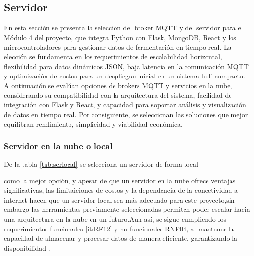 \subsection{Servidor}


En esta sección se presenta la selección del broker MQTT y del servidor para el Módulo 4
del proyecto, que integra Python con Flask, MongoDB, React y los microcontroladores para gestionar
datos de fermentación en tiempo real. La elección se fundamenta en los requerimientos de escalabilidad
horizontal, flexibilidad para datos dinámicos JSON, baja latencia en la comunicación MQTT y 
optimización de costos para un despliegue inicial en un sistema IoT compacto. 
A ontinuación se evalúan opciones 
de brokers MQTT y servicios en la nube, considerando su compatibilidad con la arquitectura del 
sistema, facilidad de integración con Flask y React, y capacidad para soportar análisis y
visualización de datos en tiempo real. Por consiguiente, se seleccionan las soluciones que
mejor equilibran rendimiento, simplicidad y viabilidad económica.

\subsubsection{Servidor en la nube o local}
De la tabla  \cref{tab:serlocal} se selecciona un servidor de forma local

como la mejor opción, y apesar de que un servidor en la nube ofrece ventajas significativas,
las limitaiciones de costos y la dependencia de la conectividad a internet hacen que un servidor local 
sea más adecuado para este proyecto,sin embargo las herramientas previamente seleccionadas permiten 
poder escalar hacia una arquitectura en la nube en un futuro.Aun así, se sigue cumpliendo los
requerimientos funcionales \ref{it:RF12} y no funcionales RNF04, al mantener 
la capacidad de almacenar y procesar datos de manera eficiente, garantizando la disponibilidad .

\begingroup
\setlength{\tabcolsep}{5pt} 
\renewcommand{\arraystretch}{1.5} 
\small 

